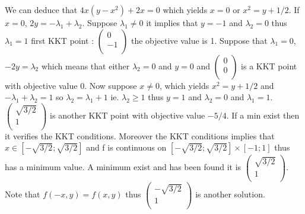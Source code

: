 \documentclass{article}
\begin{document}
We can deduce that  $4x(y-x^2)+2x = 0$ which yields $x=0$ or $x^2 = y+1/2$. If $x=0$, $2y=-\lambda_1+\lambda_2$. Suppose $\lambda_1\neq 0$ it implies that $y=-1$ and $\lambda_2 = 0$ thus $\lambda_1=1$ first KKT point : $\begin{pmatrix}
    0\\
    -1\\
\end{pmatrix}$ the objective value is 1. Suppose that $\lambda_1 = 0$, $-2y=\lambda_2$ which means that either $\lambda_2 = 0$ and $y=0$ and $\begin{pmatrix}
    0\\
    0\\
\end{pmatrix}$ is a KKT point with objective value 0.
Now suppose $x\neq 0$, which yields $x^2 = y+1/2$ and $-\lambda_1+\lambda_2 = 1$ so $\lambda_2 = \lambda_1+1$ ie. $\lambda_2\ge 1$ thus $y = 1$ and $\lambda_2 = 0$ and $\lambda_1=1$. $\begin{pmatrix}
    \sqrt{3/2}\\
    1\\
\end{pmatrix}$ is another KKT point with objective value $-5/4$.
If a min exist then it verifies the KKT conditions. Moreover the KKT conditions implies that $x\in[-\sqrt{3/2};\sqrt{3/2}]$ and f is continuous on $[-\sqrt{3/2};\sqrt{3/2}]\times[-1;1]$ thus has a minimum value. A minimum exist and has been found it is $\begin{pmatrix}
    \sqrt{3/2}\\
    1\\
\end{pmatrix}$. Note that $f(-x,y) = f(x,y)$ thus $\begin{pmatrix}
    -\sqrt{3/2}\\
    1\\
\end{pmatrix}$ is another solution.
\end{document}
